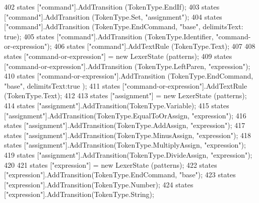 \begin{DoxyCode}
{402             states [\textcolor{stringliteral}{"command"}].AddTransition (TokenType.EndIf);
403             states [\textcolor{stringliteral}{"command"}].AddTransition (TokenType.Set, \textcolor{stringliteral}{"assignment"});
404             states [\textcolor{stringliteral}{"command"}].AddTransition (TokenType.EndCommand,  \textcolor{stringliteral}{"base"}, delimitsText: \textcolor{keyword}{true});
405             states [\textcolor{stringliteral}{"command"}].AddTransition (TokenType.Identifier, \textcolor{stringliteral}{"command-or-expression"});
406             states [\textcolor{stringliteral}{"command"}].AddTextRule (TokenType.Text);
407 
408             states [\textcolor{stringliteral}{"command-or-expression"}] = \textcolor{keyword}{new} LexerState (patterns);
409             states [\textcolor{stringliteral}{"command-or-expression"}].AddTransition (TokenType.LeftParen, \textcolor{stringliteral}{"expression"});
410             states [\textcolor{stringliteral}{"command-or-expression"}].AddTransition (TokenType.EndCommand, \textcolor{stringliteral}{"base"}, delimitsText:\textcolor{keyword}{true}
      );
411             states [\textcolor{stringliteral}{"command-or-expression"}].AddTextRule (TokenType.Text);
412 
413             states [\textcolor{stringliteral}{"assignment"}] = \textcolor{keyword}{new} LexerState (patterns);
414             states [\textcolor{stringliteral}{"assignment"}].AddTransition(TokenType.Variable);
415             states [\textcolor{stringliteral}{"assignment"}].AddTransition(TokenType.EqualToOrAssign, \textcolor{stringliteral}{"expression"});
416             states [\textcolor{stringliteral}{"assignment"}].AddTransition(TokenType.AddAssign, \textcolor{stringliteral}{"expression"});
417             states [\textcolor{stringliteral}{"assignment"}].AddTransition(TokenType.MinusAssign, \textcolor{stringliteral}{"expression"});
418             states [\textcolor{stringliteral}{"assignment"}].AddTransition(TokenType.MultiplyAssign, \textcolor{stringliteral}{"expression"});
419             states [\textcolor{stringliteral}{"assignment"}].AddTransition(TokenType.DivideAssign, \textcolor{stringliteral}{"expression"});
420 
421             states [\textcolor{stringliteral}{"expression"}] = \textcolor{keyword}{new} LexerState (patterns);
422             states [\textcolor{stringliteral}{"expression"}].AddTransition(TokenType.EndCommand, \textcolor{stringliteral}{"base"});
423             states [\textcolor{stringliteral}{"expression"}].AddTransition(TokenType.Number);
424             states [\textcolor{stringliteral}{"expression"}].AddTransition(TokenType.String);
}
\end{DoxyCode}
